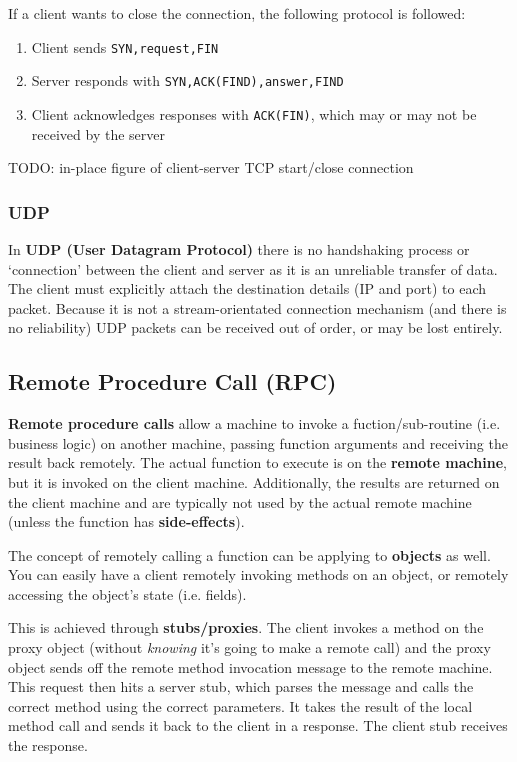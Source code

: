\documentclass{article}
\begin{document}
If a client wants to close the connection, the following protocol is followed:
\begin{enumerate}
	\item Client sends \texttt{SYN,request,FIN}
	\item Server responds with \texttt{SYN,ACK(FIND),answer,FIND}
	\item Client acknowledges responses with \texttt{ACK(FIN)}, which may or may not be received by the server
\end{enumerate}

TODO: in-place figure of client-server TCP start/close connection

\subsubsection{UDP}

In \textbf{UDP (User Datagram Protocol)} there is no handshaking process or `connection' between the client and server as it is an unreliable transfer of data. The client must explicitly attach the destination details (IP and port) to each packet. Because it is not a stream-orientated connection mechanism (and there is no reliability) UDP packets can be received out of order, or may be lost entirely.

\subsection{Remote Procedure Call (RPC)}

\textbf{Remote procedure calls} allow a machine to invoke a fuction/sub-routine (i.e. business logic) on another machine, passing function arguments and receiving the result back remotely. The actual function to execute is on the \textbf{remote machine}, but it is invoked on the client machine. Additionally, the results are returned on the client machine and are typically not used by the actual remote machine (unless the function has \textbf{side-effects}).

The concept of remotely calling a function can be applying to \textbf{objects} as well. You can easily have a client remotely invoking methods on an object, or remotely accessing the object's state (i.e. fields).

This is achieved through \textbf{stubs/proxies}. The client invokes a method on the proxy object (without \textit{knowing} it's going to make a remote call) and the proxy object sends off the remote method invocation message to the remote machine. This request then hits a server stub, which parses the message and calls the correct method using the correct parameters. It takes the result of the local method call and sends it back to the client in  a response. The client stub receives the response.
\end{document}
